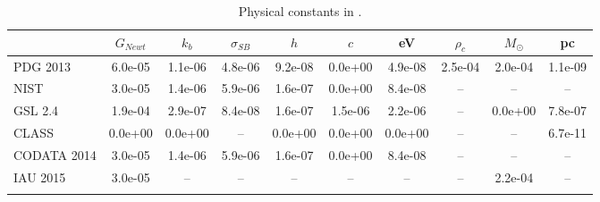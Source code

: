 \begin{table}
  \begin{center}
  \caption{Physical constants in \ccl. \label{tab:constants}}
  \begin{tabular}{lccccccccc}
\hline\hline
 & $G_{Newt}$ & $k_b$ & $\sigma_{SB}$ & $h$ & $c$ & eV & $\rho_c$ & $M_\odot$ & pc \\
\hline
PDG 2013 & 6.0e-05 & 1.1e-06 & 4.8e-06 & 9.2e-08 & 0.0e+00 & 4.9e-08 & 2.5e-04 & 2.0e-04 & 1.1e-09 \\[3pt]
NIST & 3.0e-05 & 1.4e-06 & 5.9e-06 & 1.6e-07 & 0.0e+00 & 8.4e-08 & \--- & \--- & \--- \\[3pt]
GSL 2.4 & 1.9e-04 & 2.9e-07 & 8.4e-08 & 1.6e-07 & 1.5e-06 & 2.2e-06 & \--- & 0.0e+00 & 7.8e-07 \\[3pt]
CLASS & 0.0e+00 & 0.0e+00 & \--- & 0.0e+00 & 0.0e+00 & 0.0e+00 & \--- & \--- & 6.7e-11 \\[3pt]
CODATA 2014 & 3.0e-05 & 1.4e-06 & 5.9e-06 & 1.6e-07 & 0.0e+00 & 8.4e-08 & \--- & \--- & \--- \\[3pt]
IAU 2015 & 3.0e-05 & \--- & \--- & \--- & \--- & \--- & \--- & 2.2e-04 & \--- \\
\\\hline\hline
\end{tabular}
\end{center}
\end{table}

